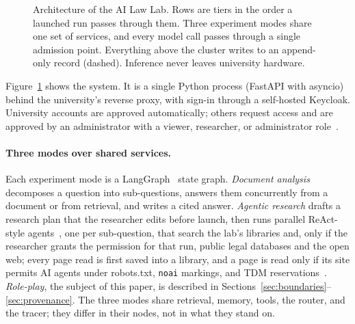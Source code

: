 \documentclass[acmsmall,screen,review]{acmart}
\newcommand{\lab}{AI Law Lab\xspace}
\begin{document}
\begin{figure}[t]
{}
\caption{Architecture of the \lab. Rows are tiers in the order a launched run passes through them. Three experiment modes share one set of services, and every model call passes through a single admission point. Everything above the cluster writes to an append-only record (dashed). Inference never leaves university hardware.}
\label{fig:arch}
\end{figure}

Figure~\ref{fig:arch} shows the system. It is a single Python process (FastAPI with asyncio) behind the university's reverse proxy, with sign-in through a self-hosted Keycloak. University accounts are approved automatically; others request access and are approved by an administrator with a viewer, researcher, or administrator role~\cite{gong2026architecture}.

\paragraph{Three modes over shared services.} Each experiment mode is a LangGraph~\cite{langgraph} state graph. \emph{Document analysis} decomposes a question into sub-questions, answers them concurrently from a document or from retrieval, and writes a cited answer. \emph{Agentic research} drafts a research plan that the researcher edits before launch, then runs parallel ReAct-style agents~\cite{yao2023react}, one per sub-question, that search the lab's libraries and, only if the researcher grants the permission for that run, public legal databases and the open web; every page read is first saved into a library, and a page is read only if its site permits AI agents under robots.txt, \texttt{noai} markings, and TDM reservations~\cite{rfc9309,tdmrep,eudsm2019,gong2026network}. \emph{Role-play}, the subject of this paper, is described in Sections~\ref{sec:boundaries}--\ref{sec:provenance}. The three modes share retrieval, memory, tools, the router, and the tracer; they differ in their nodes, not in what they stand on.
\end{document}
